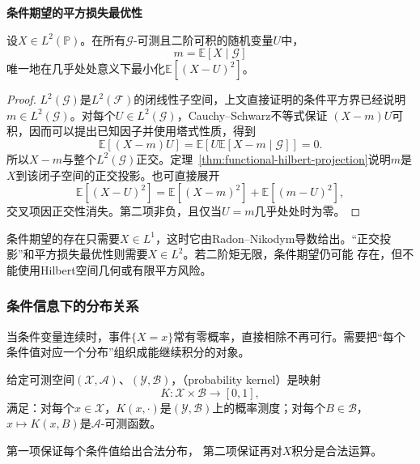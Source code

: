 \par\medskip\noindent\textbf{条件期望的平方损失最优性}\quad
\begin{theorem}[条件均值的平方损失最优性]
\label{thm:probability-conditional-mean-l2-projection}
设\(X\in L^2(\mathbb{P})\)。在所有\(\mathcal{G}\)-可测且二阶可积的随机变量\(U\)中，
\[ m=\mathbb{E}[X\mid\mathcal{G}] \]
唯一地在几乎处处意义下最小化\(\mathbb{E}[(X-U)^2]\)。
\end{theorem}

\begin{proof}
\(L^2(\mathcal{G})\)是\(L^2(\mathcal{F})\)的闭线性子空间，上文直接证明的条件平方界已经说明
\(m\in L^2(\mathcal{G})\)。对每个\(U\in L^2(\mathcal{G})\)，Cauchy--Schwarz不等式保证
\((X-m)U\)可积，因而可以提出已知因子并使用塔式性质，得到
\[ \mathbb{E}[(X-m)U]
  =\mathbb{E}\left[U\mathbb{E}[X-m\mid\mathcal{G}]\right]=0. \]
所以\(X-m\)与整个\(L^2(\mathcal{G})\)正交。定理~\ref{thm:functional-hilbert-projection}说明\(m\)是\(X\)到该闭子空间的正交投影。也可直接展开
\begin{equation}
  \mathbb{E}[(X-U)^2]
  =
  \mathbb{E}[(X-m)^2]
  +
  \mathbb{E}[(m-U)^2],
  \label{eq:probability-pythagorean-prediction}
\end{equation}
交叉项因正交性消失。第二项非负，且仅当\(U=m\)几乎处处时为零。
\end{proof}

条件期望的存在只需要\(X\in L^1\)，这时它由Radon--Nikodym导数给出。“正交投影”和平方损失最优性则需要\(X\in L^2\)。若二阶矩无限，条件期望仍可能
存在，但不能使用Hilbert空间几何或有限平方风险。


\subsubsection{条件信息下的分布关系}
\label{sec:rv-conditional-distribution}
当条件变量连续时，事件\(\{X=x\}\)常有零概率，直接相除不再可行。需要把“每个条件值对应一个分布”组织成能继续积分的对象。
\begin{definition}[概率核]
  \label{def:probability-kernel}
  给定可测空间\((\mathcal X,\mathcal A)\)、\((\mathcal Y,\mathcal B)\)，（probability kernel）是映射
  \[ K:\mathcal X\times\mathcal B\to[0,1], \]
  满足：对每个\(x\in\mathcal X\)，\(K(x,\cdot)\)是\((\mathcal Y,\mathcal B)\)上的概率测度；对每个\(B\in\mathcal B\)，\(x\mapsto K(x,B)\)是\(\mathcal A\)-可测函数。
\end{definition}
第一项保证每个条件值给出合法分布，
第二项保证再对\(X\)积分是合法运算。

